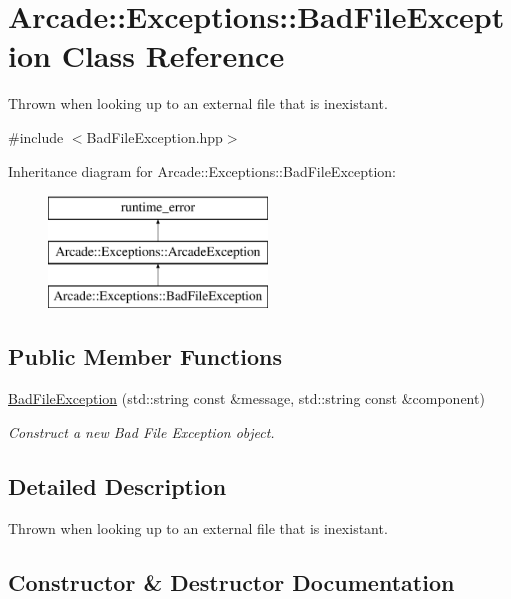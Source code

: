 \hypertarget{classArcade_1_1Exceptions_1_1BadFileException}{}\section{Arcade\+::Exceptions\+::Bad\+File\+Exception Class Reference}
\label{classArcade_1_1Exceptions_1_1BadFileException}


Thrown when looking up to an external file that is inexistant.  




{\ttfamily \#include $<$Bad\+File\+Exception.\+hpp$>$}

Inheritance diagram for Arcade\+::Exceptions\+::Bad\+File\+Exception\+:\begin{figure}[H]
\begin{center}
\leavevmode
\includegraphics[height=3.000000cm]{classArcade_1_1Exceptions_1_1BadFileException}
\end{center}
\end{figure}
\subsection*{Public Member Functions}
\begin{DoxyCompactItemize}
\item 
\mbox{\hyperlink{classArcade_1_1Exceptions_1_1BadFileException_a63947677061a2e9e28cd0dea967a3a0b}{Bad\+File\+Exception}} (std\+::string const \&message, std\+::string const \&component)
\begin{DoxyCompactList}\small\item\em Construct a new Bad File Exception object. \end{DoxyCompactList}\end{DoxyCompactItemize}


\subsection{Detailed Description}
Thrown when looking up to an external file that is inexistant. 

\subsection{Constructor \& Destructor Documentation}
\mbox{\label{classArcade_1_1Exceptions_1_1BadFileException_a63947677061a2e9e28cd0dea967a3a0b}} 
